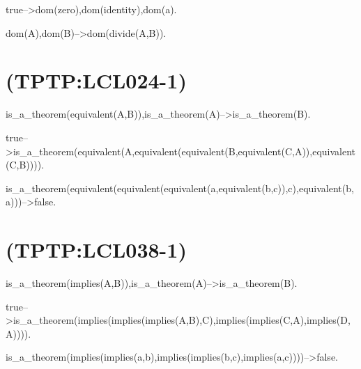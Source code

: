 true-->dom(zero),dom(identity),dom(a).

dom(A),dom(B)-->dom(divide(A,B)).

\newline
\section{(TPTP:LCL024-1)}



is_a_theorem(equivalent(A,B)),is_a_theorem(A)-->is_a_theorem(B).

true-->is_a_theorem(equivalent(A,equivalent(equivalent(B,equivalent(C,A)),equivalent(C,B)))).

is_a_theorem(equivalent(equivalent(equivalent(a,equivalent(b,c)),c),equivalent(b,a)))-->false.

\newline
\section{(TPTP:LCL038-1)}



is_a_theorem(implies(A,B)),is_a_theorem(A)-->is_a_theorem(B).

true-->is_a_theorem(implies(implies(implies(A,B),C),implies(implies(C,A),implies(D,A)))).

is_a_theorem(implies(implies(a,b),implies(implies(b,c),implies(a,c))))-->false.

